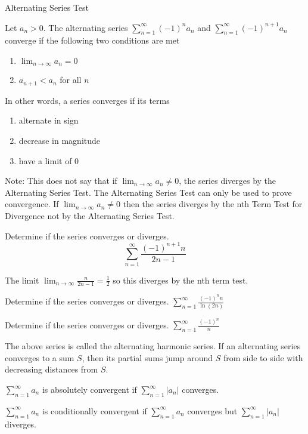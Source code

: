 \documentclass[../bccalc.tex]{subfiles}
\begin{document}
Alternating Series Test 

Let $a_n>0$. The alternating series $\sum_{n=1}^{\infty}(-1)^n a_n$ and $\sum_{n=1}^{\infty}(-1)^{n+1}a_n$ converge if the following two conditions are met 
\begin{enumerate}
    \item $\lim_{n\to\infty}a_n=0$
    \item $a_{n+1}<a_n$ for all $n$
\end{enumerate}
In other words, a series converges if its terms 
\begin{enumerate}
    \item alternate in sign 
    \item decrease in magnitude 
    \item have a limit of 0
\end{enumerate}

Note: This does not say that if $\lim_{n\to\infty}a_n\neq 0$, the series diverges by the Alternating Series Test. The Alternating Series Test can only be used to prove convergence. If $\lim_{n\to\infty}a_n\neq 0$ then the series diverges by the nth Term Test for Divergence not by the Alternating Series Test.

\begin{example}
    Determine if the series converges or diverges.
    \[ \sum_{n=1}^{\infty}\frac{(-1)^{n+1}n}{2n-1} \]

    The limit $\lim_{n\to\infty}\frac{n}{2n-1}=\frac{1}{2}$ so this diverges by the nth term test.
\end{example}

\ex Determine if the series converges or diverges. $\sum_{n=1}^{\infty}\frac{(-1)^n n}{\ln(2n)}$

\ex Determine if the series converges or diverges. $\sum_{n=1}^{\infty}\frac{(-1)^n}{n}$

The above series is called the alternating harmonic series. If an alternating series converges to a sum $S$, then its partial sums jump around $S$ from side to side with decreasing distances from $S$. 

\begin{definition}
    $\sum_{n=1}^{\infty}a_n$ is absolutely convergent if $\sum_{n=1}^{\infty}|a_n|$ converges.

    $\sum_{n=1}^{\infty}a_n$ is conditionally convergent if $\sum_{n=1}^{\infty}a_n$ converges but $\sum_{n=1}^{\infty}|a_n|$ diverges.
\end{definition}
\end{document}
